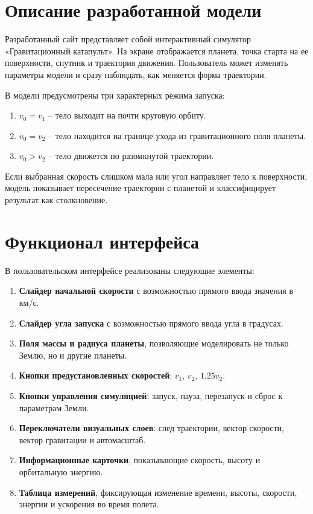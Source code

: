 \documentclass[12pt,a4paper]{article}
\begin{document}
\section{Описание разработанной модели}
Разработанный сайт представляет собой интерактивный симулятор «Гравитационный катапульт». На экране отображается планета, точка старта на ее поверхности, спутник и траектория движения. Пользователь может изменять параметры модели и сразу наблюдать, как меняется форма траектории.

В модели предусмотрены три характерных режима запуска:
\begin{enumerate}
    \item \(v_0 = v_1\) -- тело выходит на почти круговую орбиту.
    \item \(v_0 = v_2\) -- тело находится на границе ухода из гравитационного поля планеты.
    \item \(v_0 > v_2\) -- тело движется по разомкнутой траектории.
\end{enumerate}

Если выбранная скорость слишком мала или угол направляет тело к поверхности, модель показывает пересечение траектории с планетой и классифицирует результат как столкновение.

\section{Функционал интерфейса}
В пользовательском интерфейсе реализованы следующие элементы:
\begin{enumerate}
    \item \textbf{Слайдер начальной скорости} с возможностью прямого ввода значения в км/с.
    \item \textbf{Слайдер угла запуска} с возможностью прямого ввода угла в градусах.
    \item \textbf{Поля массы и радиуса планеты}, позволяющие моделировать не только Землю, но и другие планеты.
    \item \textbf{Кнопки предустановленных скоростей}: \(v_1\), \(v_2\), \(1.25v_2\).
    \item \textbf{Кнопки управления симуляцией}: запуск, пауза, перезапуск и сброс к параметрам Земли.
    \item \textbf{Переключатели визуальных слоев}: след траектории, вектор скорости, вектор гравитации и автомасштаб.
    \item \textbf{Информационные карточки}, показывающие скорость, высоту и орбитальную энергию.
    \item \textbf{Таблица измерений}, фиксирующая изменение времени, высоты, скорости, энергии и ускорения во время полета.
\end{enumerate}
\end{document}
